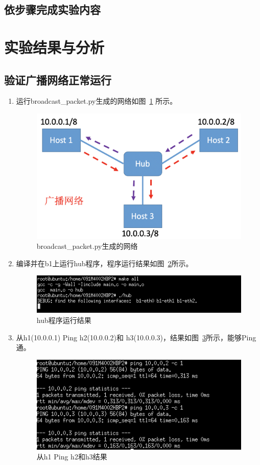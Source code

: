 \documentclass{zjureport}
\begin{document}
  \subsection{依步骤完成实验内容}

  \section{实验结果与分析}
  \subsection{验证广播网络正常运行}
      \begin{enumerate}
          \item 运行broadcast\_packet.py生成的网络如图~\ref{fig:03} 所示。
                \begin{figure}[!htbp]
                    \centering
                    \includegraphics[width=0.7\linewidth]{figures/03.jpg}
                    \caption{broadcast\_packet.py生成的网络}
                    \label{fig:03}
                \end{figure}

          \item 编译并在b1上运行hub程序，程序运行结果如图~\ref{fig:04}所示。
            \begin{figure}[!htbp]
              \centering
              \includegraphics[width=0.7\linewidth]{figures/04.jpg}
              \caption{hub程序运行结果}
              \label{fig:04}
            \end{figure}

          \item 从h1(10.0.0.1) Ping h2(10.0.0.2)和 h3(10.0.0.3)，结果如图~\ref{fig:05}所示，能够Ping通。
            \begin{figure}[!htbp]
              \centering
              \includegraphics[width=0.7\linewidth]{figures/05.jpg}
              \caption{从h1 Ping h2和h3结果}
              \label{fig:05}
            \end{figure}


\end{enumerate}
\end{document}

